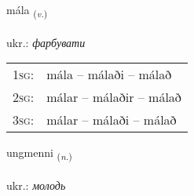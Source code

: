 \documentclass[frontgrid, backgrid]{flacards}\usepackage[]{graphicx}\usepackage[]{xcolor}
\begin{document}
\renewcommand{\flhead}{\vskip5pt \fboxsep=0pt {\small\bfseries\footnotesize Sagnorð | дієслово}}
\renewcommand{\fcfoot}{\vskip5pt \fboxsep=0pt \hspace{2pt}{\small\bfseries\footnotesize 3K}}

\renewcommand{\blhead}{\vskip5pt {\small\bfseries\footnotesize Sagnorð | дієслово }}
\renewcommand{\bcfoot}{\vskip5pt \hspace{2pt}{\small\bfseries\footnotesize 3K}}


{mála \small{\textsubscript{(\textit{v.})}} \\[1ex] %
\textphonetic{[mauːla]} \\
ukr.: \emph{фарбувати} \\  [2ex]
\renewcommand*{\arraystretch}{0.8}
\begin{tabular}{p{1cm}l}
\textsc{1sg}: & mála -- málaði -- málað \\ 
\textsc{2sg}: & málar -- málaðir -- málað \\ 
\textsc{3sg}: & málar -- málaði -- málað \\ 
\end{tabular}
}

\renewcommand{\flhead}{\vskip5pt \fboxsep=0pt {\small\bfseries\footnotesize Nafnorð | іменник}}
\renewcommand{\fcfoot}{\vskip5pt \fboxsep=0pt \hspace{2pt}{\small\bfseries\footnotesize 3K}}

\renewcommand{\blhead}{\vskip5pt {\small\bfseries\footnotesize Nafnorð | іменник }}
\renewcommand{\bcfoot}{\vskip5pt \hspace{2pt}{\small\bfseries\footnotesize 3K}}


{ungmenni \small{\textsubscript{(\textit{n.})}} \\[1ex] %
\textphonetic{[uŋkmɛnɪ]} \\
ukr.: \emph{молодь} \\  [2ex]
\renewcommand*{\arraystretch}{0.8}
}
\end{document}
